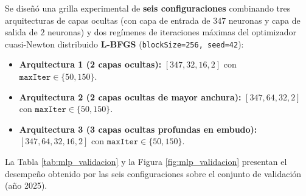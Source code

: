 \documentclass[11pt,a4paper]{article}
\begin{document}
Se diseñó una grilla experimental de \textbf{seis configuraciones} combinando tres arquitecturas de capas ocultas (con capa de entrada de $347$ neuronas y capa de salida de $2$ neuronas) y dos regímenes de iteraciones máximas del optimizador cuasi-Newton distribuido \textbf{L-BFGS} (\texttt{blockSize=256, seed=42}):
\begin{itemize}
    \item \textbf{Arquitectura 1 (2 capas ocultas):} $[347, 32, 16, 2]$ con $\texttt{maxIter} \in \{50, 150\}$.
    \item \textbf{Arquitectura 2 (2 capas ocultas de mayor anchura):} $[347, 64, 32, 2]$ con $\texttt{maxIter} \in \{50, 150\}$.
    \item \textbf{Arquitectura 3 (3 capas ocultas profundas en embudo):} $[347, 64, 32, 16, 2]$ con $\texttt{maxIter} \in \{50, 150\}$.
\end{itemize}

La Tabla \ref{tab:mlp_validacion} y la Figura \ref{fig:mlp_validacion} presentan el desempeño obtenido por las seis configuraciones sobre el conjunto de validación (año 2025).

\begin{table}[H]
\centering
\scriptsize
\renewcommand{\arraystretch}{1.2}
\caption{Resultados en el conjunto de validación (2025) por arquitectura de red neuronal y número de iteraciones L-BFGS.}
\label{tab:mlp_validacion}
\end{table}
\end{document}
